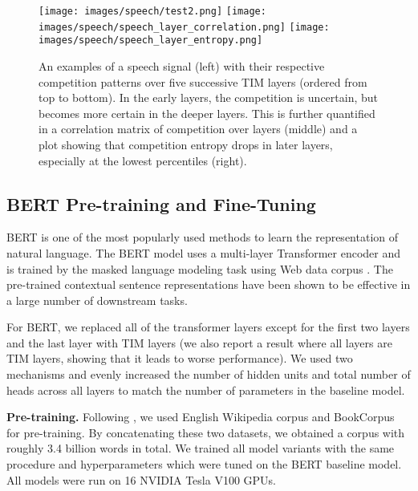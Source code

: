 \documentclass{article}
\begin{document}




\begin{figure*}[ht!]
    \centering
    \texttt{[image: images/speech/test2.png]}
    \texttt{[image: images/speech/speech\_layer\_correlation.png]}
    \texttt{[image: images/speech/speech\_layer\_entropy.png]}
    \caption{An examples of a speech signal (left) with their respective competition patterns over five successive TIM layers (ordered from top to bottom).  In the early layers, the competition is uncertain, but becomes more certain in the deeper layers.  This is further quantified in a correlation matrix of competition over layers (middle) and a plot showing that competition entropy drops in later layers, especially at the lowest percentiles (right).}
    \label{fig:se}
\end{figure*}



\subsection{BERT Pre-training and Fine-Tuning}
BERT \citep{devlin2018bert} is one of the most popularly used methods to learn the representation of natural language. The BERT model uses a multi-layer Transformer encoder and is trained by the masked language modeling task using Web data corpus \citep{liu2019roberta}. The pre-trained contextual sentence representations have been shown to be effective in a large number of downstream tasks. 

For BERT, we replaced all of the transformer layers except for the first two layers and the last layer with TIM layers (we also report a result where all layers are TIM layers, showing that it leads to worse performance). We used two mechanisms and evenly increased the number of hidden units and total number of heads across all layers to match the number of parameters in the baseline model. 

\textbf{Pre-training.} Following \citet{devlin2018bert}, we used English Wikipedia corpus and BookCorpus for pre-training. By concatenating these two datasets, we obtained a corpus with roughly 3.4 billion words in total.  We trained all model variants with the same procedure and hyperparameters which were tuned on the BERT baseline model.  All models were run on 16 NVIDIA Tesla V100 GPUs.  
\end{document}

